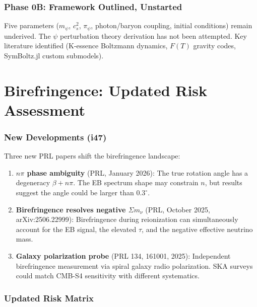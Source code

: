 \documentclass[11pt,a4paper]{article}
\begin{document}
\section{Phase 0B: Framework Outlined, Unstarted}

Five parameters ($m_\psi$, $c_s^2$, $\pi_\psi$, photon/baryon coupling, initial conditions) remain underived. The $\psi$ perturbation theory derivation has not been attempted. Key literature identified (K-essence Boltzmann dynamics, $F(T)$ gravity codes, SymBoltz.jl custom submodels).


\part{Birefringence: Updated Risk Assessment}

\section{New Developments (i47)}

Three new PRL papers shift the birefringence landscape:

\begin{enumerate}
\item \textbf{$n\pi$ phase ambiguity} (PRL, January 2026): The true rotation angle has a degeneracy $\beta + n\pi$. The EB spectrum shape may constrain $n$, but results suggest the angle could be larger than $0.3^\circ$.

\item \textbf{Birefringence resolves negative $\Sigma m_\nu$} (PRL, October 2025, arXiv:2506.22999): Birefringence during reionization can simultaneously account for the EB signal, the elevated $\tau$, and the negative effective neutrino mass.

\item \textbf{Galaxy polarization probe} (PRL 134, 161001, 2025): Independent birefringence measurement via spiral galaxy radio polarization. SKA surveys could match CMB-S4 sensitivity with different systematics.
\end{enumerate}

\section{Updated Risk Matrix}
\end{document}
